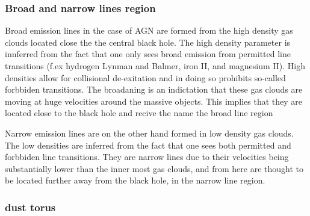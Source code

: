 \documentclass{article}
\begin{document}




\subsubsection{Broad and narrow lines region}

Broad emission lines in the case of AGN are formed from the high density gas clouds located close the the central black hole. The 
high density parameter is innferred from the fact that one only sees broad emission from permitted line transitions (f.ex hydrogen Lynman and Balmer,
iron II, and magnesium II). High densities allow for collisional de-exitation and in doing so prohibits so-called forbbiden transitions.
The broadaning is an indictation that these gas clouds are moving at  huge velocities around the massive objects. This implies that they are located close to the black hole and recive the name the broad line region

Narrow emission lines are on the other hand formed in low density gas clouds. The low densities are inferred from the fact that one sees
both permitted and forbbiden line transitions. They are narrow lines due to their velocities being substantially lower than the inner most gas clouds, and from here are thought to be located further away from the black hole, in the narrow line region. 


\subsubsection{dust torus}
\end{document}
